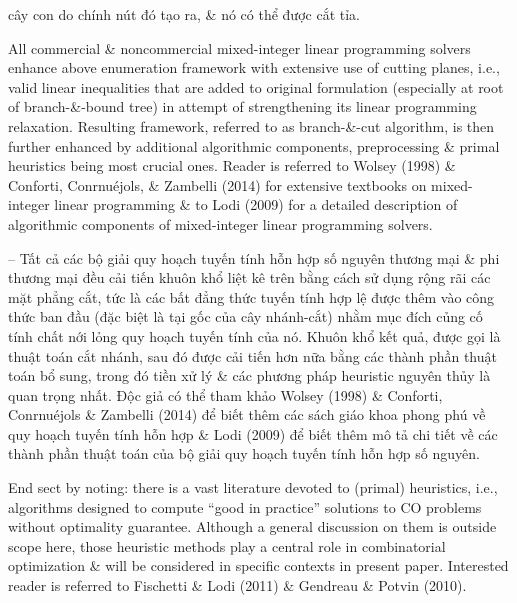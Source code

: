 \documentclass{article}
\begin{document}
\begin{itemize}
\begin{itemize}
cây con do chính nút đó tạo ra, \& nó có thể được cắt tỉa.

        All commercial \& noncommercial mixed-integer linear programming solvers enhance above enumeration framework with extensive use of cutting planes, i.e., valid linear inequalities that are added to original formulation (especially at root of branch-\&-bound tree) in attempt of strengthening its linear programming relaxation. Resulting framework, referred to as branch-\&-cut algorithm, is then further enhanced by additional algorithmic components, preprocessing \& primal heuristics being most crucial ones. Reader is referred to Wolsey (1998) \& Conforti, Conrnuéjols, \& Zambelli (2014) for extensive textbooks on mixed-integer linear programming \& to Lodi (2009) for a detailed description of algorithmic components of mixed-integer linear programming solvers.

        -- Tất cả các bộ giải quy hoạch tuyến tính hỗn hợp số nguyên thương mại \& phi thương mại đều cải tiến khuôn khổ liệt kê trên bằng cách sử dụng rộng rãi các mặt phẳng cắt, tức là các bất đẳng thức tuyến tính hợp lệ được thêm vào công thức ban đầu (đặc biệt là tại gốc của cây nhánh-cắt) nhằm mục đích củng cố tính chất nới lỏng quy hoạch tuyến tính của nó. Khuôn khổ kết quả, được gọi là thuật toán cắt nhánh, sau đó được cải tiến hơn nữa bằng các thành phần thuật toán bổ sung, trong đó tiền xử lý \& các phương pháp heuristic nguyên thủy là quan trọng nhất. Độc giả có thể tham khảo Wolsey (1998) \& Conforti, Conrnuéjols \& Zambelli (2014) để biết thêm các sách giáo khoa phong phú về quy hoạch tuyến tính hỗn hợp \& Lodi (2009) để biết thêm mô tả chi tiết về các thành phần thuật toán của bộ giải quy hoạch tuyến tính hỗn hợp số nguyên.

        End sect by noting: there is a vast literature devoted to (primal) heuristics, i.e., algorithms designed to compute ``good in practice'' solutions to CO problems without optimality guarantee. Although a general discussion on them is outside scope here, those heuristic methods play a central role in combinatorial optimization \& will be considered in specific contexts in present paper. Interested reader is referred to Fischetti \& Lodi (2011) \& Gendreau \& Potvin (2010).


\end{itemize}
\end{itemize}
\end{document}
